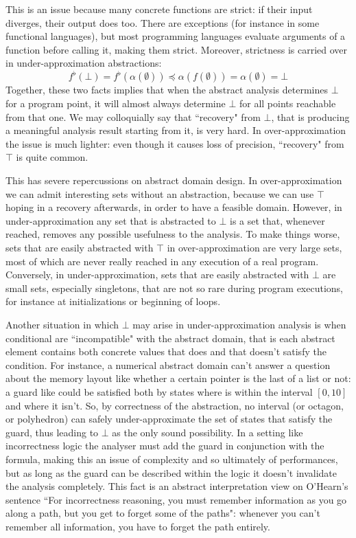 This is an issue because many concrete functions are strict: if their input diverges, their output does too. There are exceptions (for instance in some functional languages), but most programming languages evaluate arguments of a function before calling it, making them strict. Moreover, strictness is carried over in under-approximation abstractions:
\[
f^{\flat}(\bot) = f^{\flat}(\alpha(\emptyset)) \preceq \alpha(f(\emptyset)) = \alpha(\emptyset) = \bot
\]
Together, these two facts implies that when the abstract analysis determines $\bot$ for a program point, it will almost always determine $\bot$ for all points reachable from that one. We may colloquially say that ``recovery" from $\bot$, that is producing a meaningful analysis result starting from it, is very hard.
In over-approximation the issue is much lighter: even though it causes loss of precision, ``recovery" from $\top$ is quite common.

This has severe repercussions on abstract domain design. In over-approximation we can admit interesting sets without an abstraction, because we can use $\top$ hoping in a recovery afterwards, in order to have a feasible domain. However, in under-approximation any set that is abstracted to $\bot$ is a set that, whenever reached, removes any possible usefulness to the analysis.
To make things worse, sets that are easily abstracted with $\top$ in over-approximation are very large sets, most of which are never really reached in any execution of a real program. Conversely, in under-approximation, sets that are easily abstracted with $\bot$ are small sets, especially singletons, that are not so rare during program executions, for instance at initializations or beginning of loops.

Another situation in which $\bot$ may arise in under-approximation analysis is when conditional are ``incompatible" with the abstract domain, that is each abstract element contains both concrete values that does and that doesn't satisfy the condition.
For instance, a numerical abstract domain can't answer a question about the memory layout like whether a certain pointer is the last of a list or not: a guard like  could be satisfied both by states where  is within the interval $[0, 10]$ and where it isn't. So, by correctness of the abstraction, no interval (or octagon, or polyhedron) can safely under-approximate the set of states that satisfy the guard, thus leading to $\bot$ as the only sound possibility.
In a setting like incorrectness logic the analyser must add the guard in conjunction with the formula, making this an issue of complexity and so ultimately of performances, but as long as the guard can be described within the logic it doesn't invalidate the analysis completely. This fact is an abstract interpretation view on O'Hearn's sentence \cite{ohearn-incorrectness-logic} ``For incorrectness reasoning, you must remember information as you go along a path, but you get to forget some of the paths": whenever you can't remember all information, you have to forget the path entirely.
